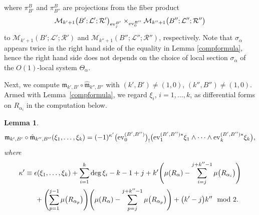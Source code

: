 \documentclass[pdftex]{sigma}
\numberwithin{equation}{section}
\newtheorem{lem}[thm]{Lemma}
\theoremstyle{definition}
\begin{document}
where
$\pi^B_{B'}$ and $\pi^B_{B''}$ are projections from the fiber product
\[{\mathcal M}_{k'+1}\bigl(B';{\mathcal L}';{\mathcal R}'\bigr)_{{\rm ev}_j^{B'}} \times_{{\rm ev}_0^{B''}} {\mathcal M}_{k''+1}\bigl(B'';{\mathcal L}'';{\mathcal R}''\bigr)\]
to ${\mathcal M}_{k'+1}(B';{\mathcal L}';{\mathcal R}')$ and ${\mathcal M}_{k''+1}(B'';{\mathcal L}'';{\mathcal R}'')$, respectively.
Note that $\sigma_{\alpha}$ appears twice in the right hand side of the equality in Lemma \ref{compformula}, hence the right hand side does not depends
on the choice of local section $\sigma_{\alpha}$ of the $O(1)$-local system $\Theta_{\alpha}$.

Next, we compute ${\mathfrak m}_{k', B'} \circ \hat{\mathfrak m}_{k'',B''}$ with $(k',B') \neq (1,0)$, $(k'',B'') \neq (1,0)$.
Armed with Lemma~\ref{compformula}, we regard $\xi_i$, $i = 1, \dots, k$, as differential forms on $R_{\alpha_i}$ in the computation below.

\begin{lem}\label{lemma}
\begin{equation}\label{lem}
{\mathfrak m}_{k', B'} \circ \hat{\mathfrak m}_{k'',B''} (\xi_1, \dots, \xi_k) = (-1)^{\kappa'} \bigl({\rm ev}_0^{(B',B'')}\bigr)_! \bigl({\rm ev}_1^{(B',B'')*} \xi_1 \wedge \dots \wedge {\rm ev}_k^{(B',B'')*} \xi_k\bigr),
\end{equation}
where
\begin{gather*}
\kappa' \equiv \epsilon(\xi_1, \dots, \xi_k) + \sum_{i=1}^{k} \deg \xi_i - k - 1 + j + k' \Biggl( \mu(R_{\alpha}) - \sum_{i=j}^{j+k''-1} \mu\bigl(R_{\alpha_i}\bigr) \Biggr)
 \\ \hphantom{\kappa' \equiv}{}
 +  \Biggl(\sum_{p=1}^{j-1} \mu\bigl(R_{\alpha_p}\bigr)\Biggr)\Biggl(\mu(R_{\alpha}) - \sum_{p=j}^{j+k''-1} \mu\bigl(R_{\alpha_p}\bigr)\Biggr) + \bigl(k'-j\bigr)k'' \mod 2.
\end{gather*}
\end{lem}
\end{document}
